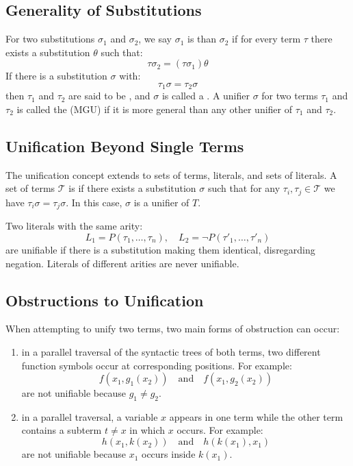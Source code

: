 \subsection{Generality of  Substitutions}\label{subsec:generality-of-substitutions}
For two substitutions \(\sigma_1\) and \(\sigma_2\), we say \(\sigma_1\) is  than \(\sigma_2\) if for every term \(\tau\) there exists a substitution \(\theta\) such that:
\begin{equation}  
  \tau\sigma_2 = (\tau\sigma_1)\theta
\end{equation}
If there is a substitution \(\sigma\) with:
\begin{equation}
\tau_1\sigma = \tau_2\sigma
\end{equation}
then \(\tau_1\) and \(\tau_2\) are said to be , and \(\sigma\) is called a .
A unifier \(\sigma\) for two terms \(\tau_1\) and \(\tau_2\) is called the  (MGU) if it is more general than any other unifier of \(\tau_1\) and \(\tau_2\).

\subsection{Unification Beyond Single Terms}\label{subsec:unification-beyond-single-terms}
The unification concept extends to sets of terms, literals, and sets of literals.  
A set of terms \(\mathcal{T}\) is  if there exists a substitution \(\sigma\) such that for any \(\tau_i, \tau_j \in \mathcal{T}\) we have \(\tau_i\sigma = \tau_j\sigma\). In this case, \(\sigma\) is a unifier of \(T\).

Two literals with the same arity:
\begin{equation}
L_1 = P(\tau_1, \ldots, \tau_n), \quad L_2 = \neg P(\tau'_1, \ldots, \tau'_n)
\end{equation}
are unifiable if there is a substitution making them identical, disregarding negation.
Literals of different arities are never unifiable.

\subsection{Obstructions to Unification}\label{subsec:obstructions-to-unification}
When attempting to unify two terms, two main forms of obstruction can occur:
\begin{enumerate}
    \item {} in a parallel traversal of the syntactic trees of both terms, two different function symbols occur at corresponding positions. For example:
    \[
    f(x_1, g_1(x_2)) \quad\text{and}\quad f(x_1, g_2(x_2))
    \]
    are not unifiable because \(g_1 \neq g_2\).
    \item {} in a parallel traversal, a variable \(x\) appears in one term while the other term contains a subterm \(t \neq x\) in which \(x\) occurs. For example:
    \[
    h(x_1, k(x_2)) \quad\text{and}\quad h(k(x_1), x_1)
    \]
    are not unifiable because \(x_1\) occurs inside \(k(x_1)\).
\end{enumerate}

